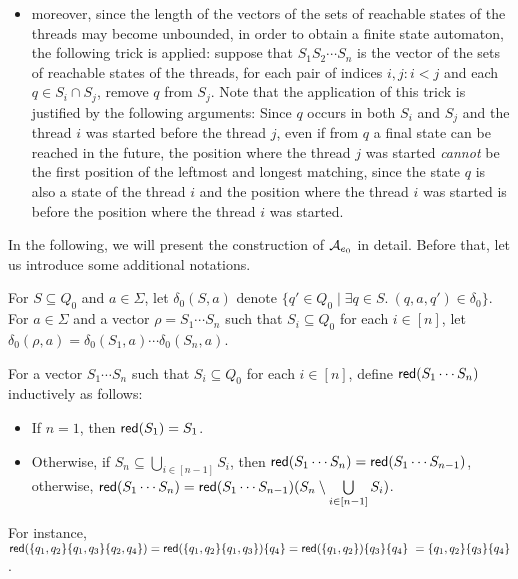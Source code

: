 \begin{itemize}
%
%
	\item moreover, since the length of the vectors of the sets of reachable states of the threads may become unbounded, in order to obtain a finite state automaton, the following trick is applied: suppose that $S_1 S_2 \cdots S_n$ is the vector of the sets of reachable states of the threads, for each pair of indices $i, j: i < j$ and each $q \in S_i \cap S_j$, remove $q$ from $S_j$. Note that the application of this trick is justified by the following arguments: Since $q$ occurs in both $S_i$ and $S_j$ and the thread $i$ was started before the thread $j$, even if from $q$  a final state can be reached in the future, the position where the thread $j$ was started \emph{cannot} be the first position of the leftmost and longest matching, since the state $q$ is also a state of the thread $i$ and the position where the thread $i$ was started is before the position where the thread $i$ was started.
\end{itemize}

In the following, we will present the construction of $\mathcal{A}_{e_0}$ in detail. Before that, let us introduce some additional notations.

For $S \subseteq Q_0$ and $a \in \Sigma$, let $\delta_0(S,a)$ denote $\{q' \in Q_0 \mid \exists q \in S.\ (q,a,q') \in \delta_0 \}$. For $a \in \Sigma$ and a vector $\rho = S_1 \cdots S_n$ such that $S_i \subseteq Q_0$ for each $i \in [n]$, let $\delta_0(\rho,a)=\delta_0(S_1,a) \cdots \delta_0(S_n, a)$.

For a vector $S_1 \cdots S_n$ such that $S_i \subseteq Q_0$ for each $i \in [n]$, define $\mathsf{red}(S_1 \cdots S_n)$ inductively as follows:  
\begin{itemize}
\item If $n = 1$, then $\mathsf{red}(S_1)=S_1$. 
\item Otherwise, if $S_n \subseteq \bigcup \limits_{i \in [n-1]} S_i$, then $\mathsf{red}(S_1 \cdots S_n)=\mathsf{red}(S_1 \cdots S_{n-1})$, otherwise, $\mathsf{red}(S_1 \cdots S_n) = \mathsf{red}(S_1 \cdots S_{n-1}) (S_n \setminus \bigcup \limits_{i \in [n-1]} S_i) $.
\end{itemize}
For instance, 
%
$\mathsf{red}(\{q_1, q_2\} \{q_1, q_3\} \{q_2, q_4\})=\mathsf{red}(\{q_1,q_2\}\{q_1,q_3\})\{q_4\}=\mathsf{red}(\{q_1,q_2\}) \{q_3\} \{q_4\}\ = \{q_1,q_2\} \{q_3\}\{q_4\}$.

